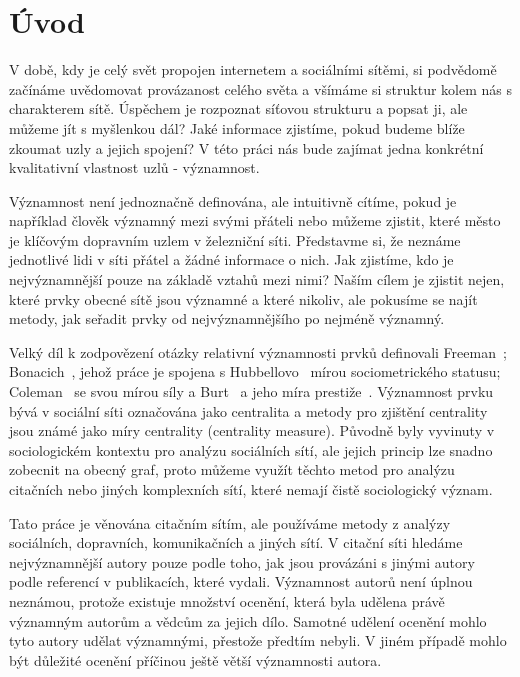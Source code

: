 \documentclass{bakalarka}
\begin{document}

\clearpage
\pagestyle{empty}
\setlength{\cftbeforetoctitleskip}{-2em}
\tableofcontents

\clearpage
\setcounter{page}{1}
\pagestyle{fancy}
\chapter{Úvod}
V době, kdy je celý svět propojen internetem a sociálními sítěmi, si podvědomě
začínáme uvědomovat provázanost celého světa a všímáme si struktur kolem nás s
charakterem sítě. Úspěchem je rozpoznat síťovou strukturu a popsat ji, ale
můžeme jít s myšlenkou dál? Jaké informace zjistíme, pokud budeme blíže zkoumat
uzly a jejich spojení? V této práci nás bude zajímat jedna konkrétní
kvalitativní vlastnost uzlů - významnost.

Významnost není jednoznačně definována, ale intuitivně cítíme, pokud je
například člověk významný mezi svými přáteli nebo můžeme zjistit, které město
je klíčovým dopravním uzlem v železniční síti.  Představme si, že neznáme
jednotlivé lidi v síti přátel a žádné informace o nich. Jak zjistíme, kdo je
nejvýznamnější pouze na základě vztahů mezi nimi? Naším cílem je zjistit nejen,
které prvky obecné sítě jsou významné a které nikoliv, ale pokusíme se najít
metody, jak seřadit prvky od nejvýznamnějšího po nejméně významný.

Velký díl k zodpovězení otázky relativní významnosti prvků definovali
Freeman~\citep{freeman1979}; Bonacich~\citep{bonacich1972}, jehož práce je
spojena s Hubbellovo~\citep{hubbell1965} mírou sociometrického statusu;
Coleman~\citep{coleman1973} se svou mírou síly a Burt~\citep{burt1982} a jeho
míra prestiže~\citep{friedkin1991}. Významnost prvku bývá v sociální síti
označována jako centralita a metody pro zjištění centrality jsou známé jako
míry centrality (centrality measure). Původně byly vyvinuty v sociologickém
kontextu pro analýzu sociálních sítí, ale jejich princip lze snadno zobecnit na
obecný graf, proto můžeme využít těchto metod pro analýzu citačních nebo jiných
komplexních sítí, které nemají čistě sociologický význam.

Tato práce je věnována citačním sítím, ale používáme metody z analýzy
sociálních, dopravních, komunikačních a jiných sítí. V citační síti hledáme
nejvýznamnější autory pouze podle toho, jak jsou provázáni s jinými autory
podle referencí v publikacích, které vydali. Významnost autorů není úplnou
neznámou, protože existuje množství ocenění, která byla udělena právě významným
autorům a vědcům za jejich dílo. Samotné udělení ocenění mohlo tyto autory
udělat významnými, přestože předtím nebyli. V jiném případě mohlo být důležité
ocenění příčinou ještě větší významnosti autora. 
\end{document}
